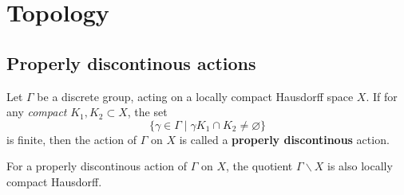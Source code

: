 \section{Topology}

\subsection{Properly discontinous actions}

Let $\Gamma$ be a discrete group, acting on a locally compact Hausdorff space $X$.
If for any \textit{compact} $K_1, K_2\subset X$,
the set \[\{\gamma\in\Gamma\mid \gamma K_1\cap K_2\ne\varnothing\}\]
is finite, then the action of $\Gamma$ on $X$ is called a \textbf{properly discontinous} action.

\begin{proposition}\label{properly discontinous action preserves locally compact and Hausdorff}
    For a properly discontinous action of $\Gamma$ on $X$,
    the quotient $\Gamma\backslash X$ is also locally compact Hausdorff.
\end{proposition}



